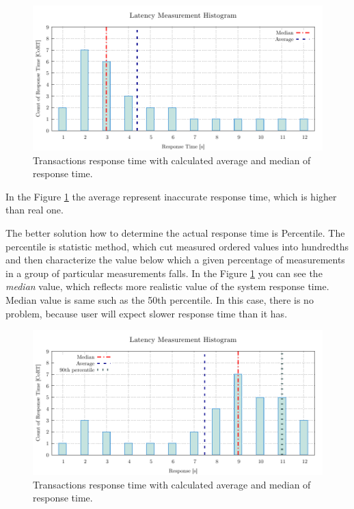 \begin{figure}[H]
  \centering
  \includegraphics[width=15cm]{obrazky-figures/average_median_1.pdf}
  \caption{Transactions response time with calculated average and median of response time.}
  \label{fig:average_percentil_1}
\end{figure}
In the Figure \ref{fig:average_percentil_1} the average represent inaccurate response time, which is higher than real one.

The better solution how to determine the actual response time is Percentile. The percentile is statistic method, which cut measured ordered values into hundredths and then characterize the value below which a given percentage of measurements in a group of particular measurements falls. In the Figure \ref{fig:average_percentil_1} you can see the \emph{median} value, which reflects more realistic value of the system response time. Median value is same such as the 50th percentile. In this case, there is no problem, because user will expect slower response time than it has.

\begin{figure}[H]
  \centering
  \includegraphics[width=15cm]{obrazky-figures/average_median_2.pdf}
  \caption{Transactions response time with calculated average and median of response time.}
  \label{fig:average_percentil_2}
\end{figure}

